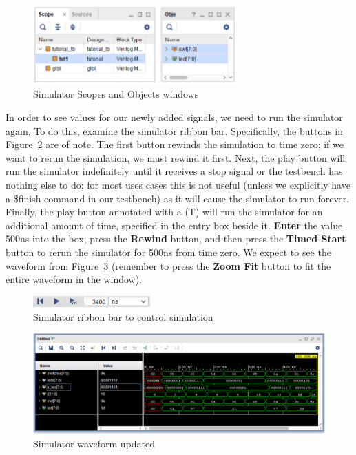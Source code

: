 \documentclass[11pt]{article}
\begin{document}
\begin{figure}[!h]
    \centering
    \includegraphics[width=0.7\textwidth]{images/sim_scope.png}
    \caption{Simulator Scopes and Objects windows}
    \label{fig:sim_scope}
\end{figure}

In order to see values for our newly added signals, we need to run the simulator again. To do this, examine the simulator ribbon bar. Specifically, the buttons in Figure~\ref{fig:sim_button} are of note. The first button rewinds the simulation to time zero; if we want to rerun the simulation, we must rewind it first. Next, the play button will run the simulator indefinitely until it receives a stop signal or the testbench has nothing else to do; for most uses cases this is not useful (unless we explicitly have a \$finish command in our testbench) as it will cause the simulator to run forever. Finally, the play button annotated with a (T) will run the simulator for an additional amount of time, specified in the entry box beside it. \textbf{Enter} the value 500ns into the box, press the \textbf{Rewind} button, and then press the \textbf{Timed Start} button to rerun the simulator for 500ns from time zero. We expect to see the waveform from Figure~\ref{fig:sim_wave2} (remember to press the \textbf{Zoom Fit} button to fit the entire waveform in the window).

\begin{figure}[!h]
    \centering
    \includegraphics[width=0.4\textwidth]{images/sim_button.png}
    \caption{Simulator ribbon bar to control simulation}
    \label{fig:sim_button}
\end{figure}

\begin{figure}[!h]
    \centering
    \includegraphics[width=\textwidth]{images/sim_wave2.png}
    \caption{Simulator waveform updated}
    \label{fig:sim_wave2}
\end{figure}
\end{document}
